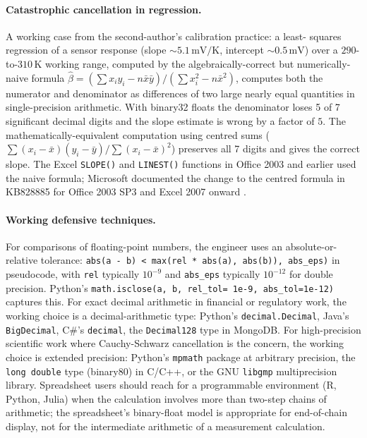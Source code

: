 \paragraph{Catastrophic cancellation in regression.} A working
case from the second-author's calibration practice: a least-
squares regression of a sensor response (slope $\sim 5.1\,\si{
\milli\volt}/\si{\kelvin}$, intercept $\sim 0.5\,\si{\milli
\volt}$) over a $290$-to-$310\,\si{\kelvin}$ working range,
computed by the algebraically-correct but numerically-naive
formula
$\hat{\beta} = (\sum x_{i} y_{i} - n \bar{x}\bar{y})/(\sum
x_{i}^{2} - n \bar{x}^{2})$, computes both the numerator and
denominator as differences of two large nearly equal quantities
in single-precision arithmetic. With binary32 floats the
denominator loses 5 of 7 significant decimal digits and the
slope estimate is wrong by a factor of $5$. The
mathematically-equivalent computation using centred sums
($\sum (x_{i} - \bar{x})(y_{i} - \bar{y}) / \sum
(x_{i} - \bar{x})^{2}$) preserves all 7 digits and gives the
correct slope. The Excel \texttt{SLOPE()} and \texttt{LINEST()}
functions in Office 2003 and earlier used the naive formula;
Microsoft documented the change to the centred formula in
KB828885 for Office 2003 SP3 and Excel 2007 onward
\cite{web:ch04t3-msft-kb828885}.

\paragraph{Working defensive techniques.} For comparisons of
floating-point numbers, the engineer uses an absolute-or-
relative tolerance: \texttt{abs(a - b) < max(rel * abs(a),
abs(b)), abs\_eps)} in pseudocode, with \texttt{rel} typically
$10^{-9}$ and \texttt{abs\_eps} typically $10^{-12}$ for
double precision. Python's \texttt{math.isclose(a, b, rel\_tol=
1e-9, abs\_tol=1e-12)} captures this. For exact decimal
arithmetic in financial or regulatory work, the working choice
is a decimal-arithmetic type: Python's \texttt{decimal.Decimal},
Java's \texttt{BigDecimal}, C\#'s \texttt{decimal}, the
\texttt{Decimal128} type in MongoDB. For high-precision
scientific work where Cauchy-Schwarz cancellation is the
concern, the working choice is extended precision: Python's
\texttt{mpmath} package at arbitrary precision, the
\texttt{long double} type (binary80) in C/C++, or the GNU
\texttt{libgmp} multiprecision library. Spreadsheet users
should reach for a programmable environment (R, Python,
Julia) when the calculation involves more than two-step
chains of arithmetic; the spreadsheet's binary-float model
is appropriate for end-of-chain display, not for the
intermediate arithmetic of a measurement calculation.

